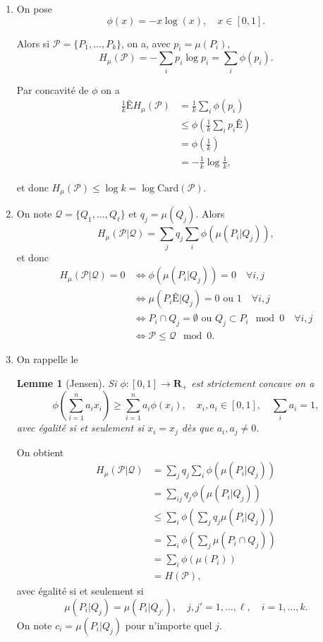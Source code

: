 \documentclass[a4paper,12pt,openany]{article}
\theoremstyle{plain}
\newtheorem{lem}{Lemme}
\theoremstyle{definition}
\newcommand{\R}{\mathbf{R}}
\newcommand{\Pcal}{\mathcal{P}}
\newcommand{\Qcal}{\mathcal{Q}}
\begin{document}
\begin{enumerate}
\item On pose
$$
\phi(x) = -x \log(x), \quad x \in [0,1].
$$

Alors si $\Pcal = \{P_1, \dots, P_k\}$, on a, avec $p_i = \mu(P_i),$
$$
H_\mu(\Pcal) = -\sum_{i} p_i \log p_i =  \sum_i \phi(p_i).
$$

Par concavit\'e de $\phi$ on a
$$
\begin{aligned}
\frac{1}{k}ÊH_\mu(\Pcal) &= \frac{1}{k} \sum_i \phi(p_i)  \\
&\leqslant \phi \left(\frac{1}{k} \sum_i p_iÊ\right)  \\
&= \phi \left(\frac{1}{k}\right)  \\
&= -\frac{1}{k} \log \frac{1}{k},
\end{aligned}
$$

et donc $H_\mu(\Pcal) \leqslant \log k = \log \mathrm{Card}(\Pcal).$
\item On note $\Qcal = \{Q_1, \dots, Q_\ell\}$ et $q_j = \mu(Q_j).$  Alors
$$
H_\mu(\Pcal |\Qcal) = \sum_j q_j \sum_i \phi(\mu(P_i|Q_j)),
$$
 et donc 
$$
\begin{aligned}
H_\mu(\Pcal |\Qcal) = 0 &\iff \phi(\mu(P_i|Q_j)) = 0 \quad  \forall i,j  \\
&\iff \mu(P_iÊ|Q_j) = 0 \text{ ou }1 \quad \forall i,j  \\
&\iff P_i \cap Q_j = \emptyset \text{ ou } Q_j \subset P_i \mod 0 \quad \forall i,j  \\
&\iff \Pcal \leqslant \Qcal \mod 0.
\end{aligned}
$$

\item On rappelle le
\begin{lem}[Jensen]
Si $\phi : [0,1] \to \R_+$ est strictement concave on a
$$
\phi\left(\sum_{i=1}^na_i x_i\right) \geqslant \sum_{i=1}^n a_i \phi(x_i), \quad x_i, a_i \in [0,1], \quad \sum_i a_i = 1,
$$
avec \'egalit\'e si et seulement si $x_i = x_j$ d\`es que $a_i, a_j \neq 0.$
\end{lem}



On obtient
$$
\begin{aligned}
H_\mu(\Pcal |\Qcal) &= \sum_j q_j \sum_i \phi(\mu(P_i|Q_j))  \\
&= \sum_{ij} q_j \phi(\mu(P_i|Q_j))  \\
&\leqslant \sum_i \phi\left(\sum_j q_j\mu(P_i|Q_j)\right)  \\
&= \sum_i \phi\left(\sum_j \mu(P_i \cap Q_j)\right)  \\ 
&= \sum_i \phi(\mu(P_i))  \\
&= H(\Pcal),
\end{aligned}
$$
 avec \'egalit\'e si et seulement si
$$
\mu(P_i|Q_j) = \mu(P_i|Q_{j'}), \quad j,j' = 1, \dots, \ell, \quad i = 1, \dots, k.
$$
 On note $c_i = \mu(P_i |Q_j)$ pour n'importe quel $j$.





\end{enumerate}
\end{document}
